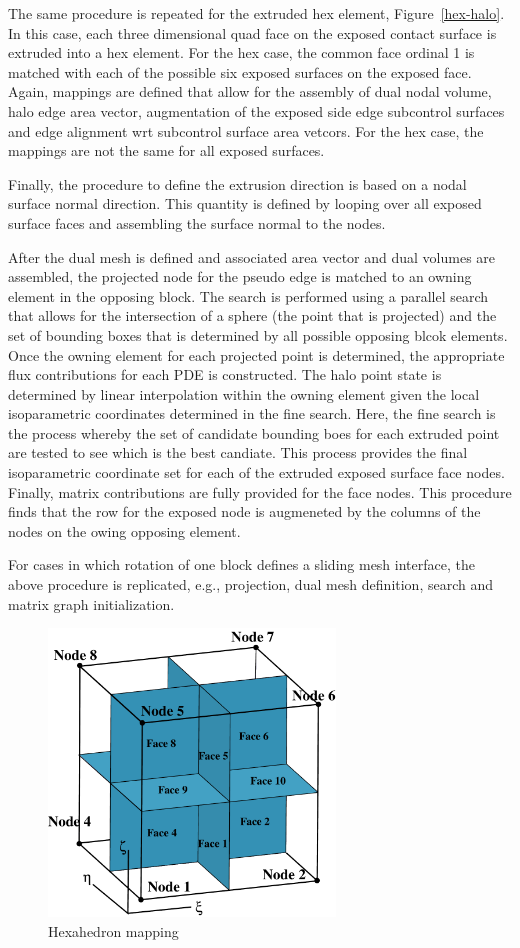 The same procedure is repeated for the extruded hex element, Figure~\ref{hex-halo}.
In this case, each three dimensional quad face on the exposed contact surface is extruded
into a hex element. For the hex case, the common face ordinal 1 is matched with each of the possible
six exposed surfaces on the exposed face. Again, mappings are defined that allow for the 
assembly of dual nodal volume, halo edge area vector, augmentation of the exposed side edge
subcontrol surfaces and edge alignment wrt subcontrol surface area vetcors. For the hex case, the mappings are
not the same for all exposed surfaces.

Finally, the procedure to define the extrusion direction is based on a nodal surface normal direction.
This quantity is defined by looping over all exposed surface faces and assembling the surface normal to the nodes.

After the dual mesh is defined and associated area vector and dual volumes are assembled, the projected
node for the pseudo edge is matched to an owning element in the opposing block. The search is performed using a
parallel search that allows for the intersection of a sphere (the point that is projected) and the set of bounding boxes
that is determined by all possible opposing blcok elements. Once the owning element for each projected point
is determined, the appropriate flux contributions for each PDE is constructed. The halo point state is determined by linear
interpolation within the owning element given the local isoparametric coordinates determined in the fine search. Here, the 
fine search is the process whereby the set of candidate bounding boes for each extruded point are tested to see which
is the best candiate. This process provides the final isoparametric coordinate set for each of the extruded exposed surface
face nodes. Finally, matrix contributions are fully provided for the face nodes. This procedure finds that the row for the
exposed node is augmeneted by the columns of the nodes on the owing opposing element.

For cases in which rotation of one block defines a sliding mesh interface, the above procedure is replicated, e.g., projection,
dual mesh definition, search and matrix graph initialization.
\begin{figure}[ht]
\centerline{\includegraphics[width=3.0in]{images/hex.pdf}}
\vspace{0.1in}
\caption{Hexahedron mapping}
\label{quad-halo}
\end{figure}


